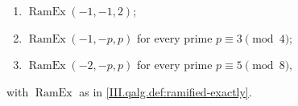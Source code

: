 \begin{enumerate}[label=(\alph*)]
\item $\operatorname{RamEx}(-1,-1,2)$;
\item $\operatorname{RamEx}(-1,-p,p)$ for every prime $p\equiv3\pmod4$;
\item $\operatorname{RamEx}(-2,-p,p)$ for every prime $p\equiv5\pmod8$,
\end{enumerate}
with $\operatorname{RamEx}$ as in \cref{III.qalg.def:ramified-exactly}.

